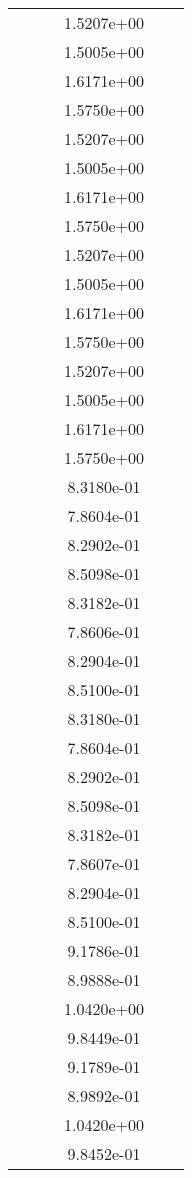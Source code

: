 \begin{xltabular}{\textwidth}{r|rS[table-format=1.3e+2]S[table-format=1.4e+2]S[table-format=1.4e+2]S[table-format=-1.5]}
&  &  & 1.5207e+00 & & \\
&  &  & 1.5005e+00 & & \\
&  &  & 1.6171e+00 & & \\
&  &  & 1.5750e+00 & & \\
&  &  & 1.5207e+00 & & \\
&  &  & 1.5005e+00 & & \\
&  &  & 1.6171e+00 & & \\
&  &  & 1.5750e+00 & & \\
&  &  & 1.5207e+00 & & \\
&  &  & 1.5005e+00 & & \\
&  &  & 1.6171e+00 & & \\
&  &  & 1.5750e+00 & & \\
&  &  & 1.5207e+00 & & \\
&  &  & 1.5005e+00 & & \\
&  &  & 1.6171e+00 & & \\
&  &  & 1.5750e+00 & & \\
&  &  & 8.3180e-01 & & \\
&  &  & 7.8604e-01 & & \\
&  &  & 8.2902e-01 & & \\
&  &  & 8.5098e-01 & & \\
&  &  & 8.3182e-01 & & \\
&  &  & 7.8606e-01 & & \\
&  &  & 8.2904e-01 & & \\
&  &  & 8.5100e-01 & & \\
&  &  & 8.3180e-01 & & \\
&  &  & 7.8604e-01 & & \\
&  &  & 8.2902e-01 & & \\
&  &  & 8.5098e-01 & & \\
&  &  & 8.3182e-01 & & \\
&  &  & 7.8607e-01 & & \\
&  &  & 8.2904e-01 & & \\
&  &  & 8.5100e-01 & & \\
&  &  & 9.1786e-01 & & \\
&  &  & 8.9888e-01 & & \\
&  &  & 1.0420e+00 & & \\
&  &  & 9.8449e-01 & & \\
&  &  & 9.1789e-01 & & \\
&  &  & 8.9892e-01 & & \\
&  &  & 1.0420e+00 & & \\
&  &  & 9.8452e-01 & & \\

\end{xltabular}
